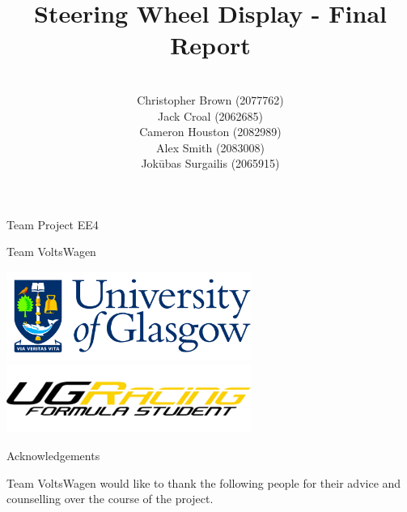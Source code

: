 \documentclass[a4paper,12pt]{article}
\author{\vspace{1cm} \\
        Christopher Brown (2077762) \\
        Jack Croal (2062685) \\
        Cameron Houston (2082989) \\
        Alex Smith (2083008) \\
        Jok\=ubas Surgailis (2065915) \\
}
\date{}
\title{\vspace{1.0cm}Steering Wheel Display - Final Report\vspace{1.0cm}}
\begin{document}
\maketitle

\thispagestyle{empty}

\begin{center}
\Large{Team Project EE4}
\end{center}

\begin{center}
\huge{Team VoltsWagen}
\end{center}

\vspace{2.0cm}

\begin{center}
\includegraphics[width=8cm]{Figures/uni_logo.png}
\includegraphics[width=8cm]{Figures/ugr_logo_black.png}
\end{center}

\clearpage
{}



\newpage
{\Huge Acknowledgements} \\

{\large

  \vspace{1.0cm}

  Team VoltsWagen would like to thank the following people for their advice and counselling over the course of the project. \\

  \vspace{1.0cm}


}
\end{document}
